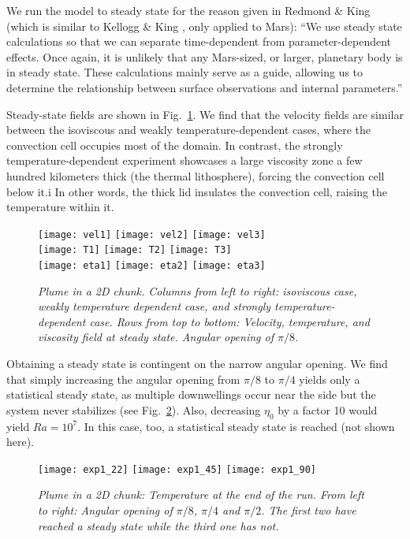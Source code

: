 We run the model to steady state for the reason given in Redmond \& King \cite{reki04} (which is similar to Kellogg \& King \cite{keki97}, only applied to Mars): ``We use steady state calculations so that we can separate time-dependent from parameter-dependent effects. Once again, it is unlikely that any Mars-sized, or larger, planetary body is in steady state. These calculations mainly serve as a guide, allowing us to determine the relationship between surface observations and internal parameters.''

Steady-state fields are shown in Fig.~\ref{fig:plume-diff-creep}. We find that the velocity fields are similar between the isoviscous and weakly temperature-dependent cases, where the convection cell occupies most of the domain. In contrast, the strongly temperature-dependent experiment showcases a large viscosity zone a few hundred kilometers thick (the thermal lithosphere), forcing the convection cell below it.i In other words, the thick lid insulates the convection cell, raising the temperature within it.

\begin{figure}
  \centering
  \texttt{[image: vel1]}
  \texttt{[image: vel2]}
  \texttt{[image: vel3]}\\
  \texttt{[image: T1]}
  \texttt{[image: T2]}
  \texttt{[image: T3]}\\
  \texttt{[image: eta1]}
  \texttt{[image: eta2]}
  \texttt{[image: eta3]}
  \caption{\it Plume in a 2D chunk. Columns from left to right: isoviscous case, weakly temperature dependent case, and strongly temperature-dependent case. Rows from top to bottom: Velocity, temperature, and viscosity field at steady state. Angular opening of $\pi/8$.}
  \label{fig:plume-diff-creep}
\end{figure}

Obtaining a steady state is contingent on the narrow angular opening. We find that simply increasing the angular opening from $\pi/8$ to $\pi/4$ yields only a statistical steady state, as multiple downwellings occur near the side but the system never stabilizes (see Fig.~\ref{fig:plume-angular-opening}). Also, decreasing $\eta_0$ by a factor 10 would yield $Ra=10^7$. In this case, too, a statistical steady state is reached (not shown here).

\begin{figure}
  \centering
  \texttt{[image: exp1\_22]}
  \texttt{[image: exp1\_45]}
  \texttt{[image: exp1\_90]}
  \caption{\it Plume in a 2D chunk: Temperature at the end of the run. From left to right: Angular opening of
$\pi/8$, $\pi/4$ and $\pi/2$. The first two have reached a steady state while the third one has not.}
  \label{fig:plume-angular-opening}
\end{figure}

